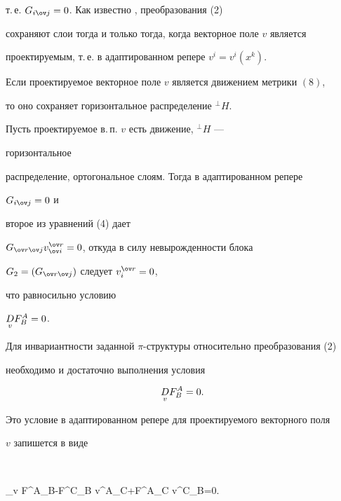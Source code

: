 т.\,е. $G_{i\ov j}=0$. Как известно \cite{1}, преобразования (2)


сохраняют слои тогда и только тогда, когда векторное поле $v$ является


проектируемым, т.\,е. в адаптированном репере $v^i=v^i(x^k)$.





\begin{thm}


Если проектируемое векторное поле $v$ является движением метрики $(8)$,


то оно сохраняет горизонтальное распределение ${}^\bot H$.


\end{thm}





\begin{pf}


Пусть проектируемое в.\,п. $v$ есть движение, ${}^\bot H$ ---


горизонтальное


распределение, ортогональное слоям. Тогда в адаптированном репере


$G_{i\ov j}=0$ и


второе из уравнений (4) дает


$G_{\ov r\ov j}v^{\ov r}_{\ov i}=0$, откуда в силу невырожденности блока


$G_2=(G_{\ov r\ov j})$ следует $v^{\ov r}_i=0$,


что равносильно \cite{4} условию


$\underset{v}{D}{}F^A_B=0$.


\end{pf}





Для инвариантности заданной $\pi$-структуры относительно преобразования (2)


необходимо и достаточно выполнения условия \cite{1}


\begin{equation}


\down{v}{D}F^A_B=0.


\end{equation}


Это условие в адаптированном репере для проектируемого векторного поля


$v$ запишется в виде


$$


\nabla_v F^A_B-F^C_B v^A_C+F^A_C v^C_B=0.


